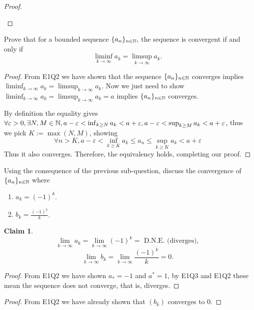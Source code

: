 \documentclass{homework}
\newcommand{\N}{\bb{N}} %
\newcommand{\ra}{\rightarrow}
\newcommand{\?}{\stackrel{?}{=}}
\newcommand{\ep}{\varepsilon}
\theoremstyle{definition}
\newtheorem*{claim}{Claim}
\begin{document}
\begin{proof}
\begin{enumerate}
     \end{enumerate}


\end{proof}


\question[3] Prove that for a bounded sequence $\{a_n\}_{n\in\N},$ the sequence is convergent if and only if \[\liminf_{k\ra\infty}a_k=\limsup_{k\ra\infty}a_k.\]

\begin{proof}
    From E1Q2 we have shown that the sequence $\{a_n\}_{n\in\N}$ converges implies $\liminf_{k\ra\infty}a_k=\limsup_{k\ra\infty}a_k$. Now we just need to show $\liminf_{k\ra\infty}a_k=\limsup_{k\ra\infty}a_k=a$ implies $\{a_n\}_{n\in\N}$ converges. 

    By definition the equality gives $\forall \ep > 0, \exists N,M\in\N, a-\ep<\inf_{k\geq N}a_k<a+\ep, a-\ep<\sup_{k\geq M}a_k<a+\ep$, thus we pick $K:=\max(N,M)$, showing \[
    \forall n>K, a-\ep<\inf_{k\geq K}a_k \leq a_n \leq \sup_{k\geq K}a_k < a+\ep
    \]
    Thus it also converges. Therefore, the equivalency holds, completing our proof.
\end{proof}


\question[4] Using the consequence of the previous sub-question, discuss the convergence of $\{a_n\}_{n\in\N}$ where 
\begin{enumerate}
    \item $a_k=(-1)^k$.
    \item $b_k=\frac{(-1)^k}{k}$.
\end{enumerate}

\begin{claim}
    \[\lim_{k\ra\infty}a_k=\lim_{k\ra\infty}(-1)^k=\text{ D.N.E. (diverges)},\]
    \[\lim_{k\ra\infty}b_k=\lim_{k\ra\infty}\frac{(-1)^k}{k}=0.\]
\end{claim}
\begin{proof}
    From E1Q2 we have shown $a_*=-1$ and $a^*=1$, by E1Q3 and E1Q2 these mean the sequence does not converge, that is, diverges. 
\end{proof}
\begin{proof}
    From E1Q2 we have already shown that $(b_k)$ converges to 0. 
\end{proof}
\end{document}
